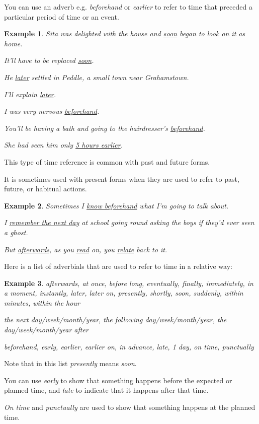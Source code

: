 \documentclass[oneside]{book}
\numberwithin{equation}{section}
\newtheorem{example}{Example}[section]
\begin{document}
You can use an adverb e.g. \textit{beforehand} or \textit{earlier} to refer to time that preceded a particular period of time or an event.
\begin{example}
    Sita was delighted with the house and \underline{soon} began to look on it as home.
    
    It'll have to be replaced \underline{soon}.
    
    He \underline{later} settled in Peddle, a small town near Grahamstown.
    
    I'll explain \underline{later}.
    
    I was very nervous \underline{beforehand}.
    
    You'll be having a bath and going to the hairdresser's \underline{beforehand}.
    
    She had seen him only \underline{5 hours earlier}.
\end{example}
This type of time reference is common with past and future forms.

It is sometimes used with present forms when they are used to refer to past, future, or habitual actions.
\begin{example}
    Sometimes I \underline{know beforehand} what I'm going to talk about.
    
    I \underline{remember the next day} at school going round asking the boys if they'd ever seen a ghost.
    
    But \underline{afterwards}, as you \underline{read} on, you \underline{relate} back to it.
\end{example}
Here is a list of adverbials that are used to refer to time in a relative way:
\begin{example}
    afterwards, at once, before long, eventually, finally, immediately, in a moment, instantly, later, later on, presently, shortly, soon, suddenly, within minutes, within the hour
    
    the next day/week/month/year, the following day/week/month/year, the day/week/month/year after
    
    beforehand, early, earlier, earlier on, in advance, late, 1 day, on time, punctually
\end{example}
Note that in this list \textit{presently} means \textit{soon}.

%
You can use \textit{early} to show that something happens before the expected or planned time, and \textit{late} to indicate that it happens after that time.

\textit{On time} and \textit{punctually} are used to show that something happens at the planned time.
\end{document}
